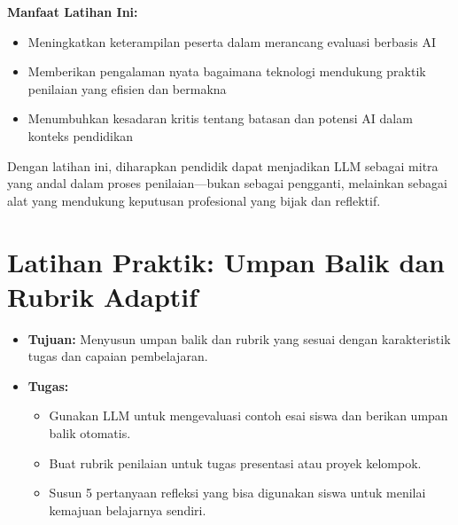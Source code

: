 \textbf{Manfaat Latihan Ini:}
\begin{itemize}
	\item Meningkatkan keterampilan peserta dalam merancang evaluasi berbasis AI
	\item Memberikan pengalaman nyata bagaimana teknologi mendukung praktik penilaian yang efisien dan bermakna
	\item Menumbuhkan kesadaran kritis tentang batasan dan potensi AI dalam konteks pendidikan
\end{itemize}

Dengan latihan ini, diharapkan pendidik dapat menjadikan LLM sebagai mitra yang andal dalam proses penilaian—bukan sebagai pengganti, melainkan sebagai alat yang mendukung keputusan profesional yang bijak dan reflektif.

\section*{Latihan Praktik: Umpan Balik dan Rubrik Adaptif}
\begin{itemize}
	\item \textbf{Tujuan:} Menyusun umpan balik dan rubrik yang sesuai dengan karakteristik tugas dan capaian pembelajaran.
	\item \textbf{Tugas:}
	\begin{itemize}
		\item Gunakan LLM untuk mengevaluasi contoh esai siswa dan berikan umpan balik otomatis.
		\item Buat rubrik penilaian untuk tugas presentasi atau proyek kelompok.
		\item Susun 5 pertanyaan refleksi yang bisa digunakan siswa untuk menilai kemajuan belajarnya sendiri.
	\end{itemize}
\end{itemize}
